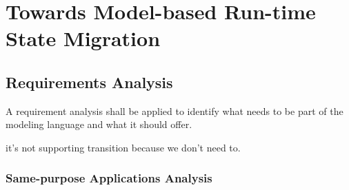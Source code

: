 \chapter{Towards Model-based Run-time State Migration}
\label{ch:requirements}

\section{Requirements Analysis}

A requirement analysis shall be applied to identify what needs to be part of the modeling language and what it should offer.

it's not supporting transition because we don't need to.



\subsection{Same-purpose Applications Analysis}

